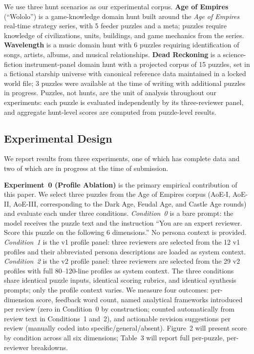 We use three hunt scenarios as our experimental corpus. \textbf{Age of Empires} (``Wololo'') is a game-knowledge domain hunt built around the \emph{Age of Empires} real-time strategy series, with 5 feeder puzzles and a meta; puzzles require knowledge of civilizations, units, buildings, and game mechanics from the series. \textbf{Wavelength} is a music domain hunt with 6 puzzles requiring identification of songs, artists, albums, and musical relationships. \textbf{Dead Reckoning} is a science-fiction instrument-panel domain hunt with a projected corpus of 15 puzzles, set in a fictional starship universe with canonical reference data maintained in a locked world file; 3 puzzles were available at the time of writing with additional puzzles in progress. Puzzles, not hunts, are the unit of analysis throughout our experiments: each puzzle is evaluated independently by its three-reviewer panel, and aggregate hunt-level scores are computed from puzzle-level results.

\subsection{Experimental Design}

We report results from three experiments, one of which has complete data and two of which are in progress at the time of submission.

\textbf{Experiment~0 (Profile Ablation)} is the primary empirical contribution of this paper. We select three puzzles from the Age of Empires corpus (AoE-I, AoE-II, AoE-III, corresponding to the Dark Age, Feudal Age, and Castle Age rounds) and evaluate each under three conditions. \emph{Condition~0} is a bare prompt: the model receives the puzzle text and the instruction ``You are an expert reviewer. Score this puzzle on the following 6 dimensions.'' No persona context is provided. \emph{Condition~1} is the v1 profile panel: three reviewers are selected from the 12 v1 profiles and their abbreviated persona descriptions are loaded as system context. \emph{Condition~2} is the v2 profile panel: three reviewers are selected from the 29 v2 profiles with full 80--120-line profiles as system context. The three conditions share identical puzzle inputs, identical scoring rubrics, and identical synthesis prompts; only the profile context varies. We measure four outcomes: per-dimension score, feedback word count, named analytical frameworks introduced per review (zero in Condition~0 by construction; counted automatically from review text in Conditions~1 and~2), and actionable revision suggestions per review (manually coded into specific/general/absent). Figure~2 will present score by condition across all six dimensions; Table~3 will report full per-puzzle, per-reviewer breakdowns.

